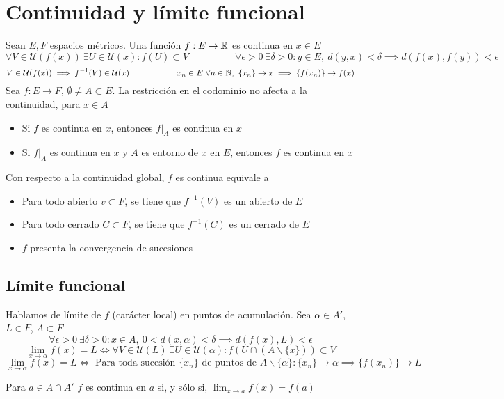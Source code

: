 \section{Continuidad y límite funcional}
Sean $E,F$ espacios métricos.
Una función $f:E\rightarrow\mathbb{R}$ es continua en $x\in E$
$$ \forall V\in\mathcal{U}(f(x)) \ \exists U\in \mathcal{U}(x) : f(U) \subset V\hspace{2cm}
\forall\epsilon>0 \ \exists\delta>0 : y\in E,\ d(y,x)<\delta \implies d(f(x),f(y))<\epsilon$$
$$V\in\mathcal{U}(f(x)) \implies f^{-1}(V)\in\mathcal{U}(x)  \hspace{2cm}
x_n\in E\ \forall n\in\mathbb{N},\ \{x_n\}\rightarrow x\implies \{f(x_n)\}\rightarrow f(x) $$
Sea $f:E\rightarrow F$, $\emptyset\not = A\subset E$. La restricción en el codominio no afecta a la continuidad, para $x\in A$
\begin{itemize}
	\item Si $f$ es continua en $x$, entonces $f|_A$ es continua en $x$
	\item Si $f|_A$ es continua en $x$ y $A$ es entorno de $x$ en $E$, entonces $f$ es continua en $x$
\end{itemize}
Con respecto a la continuidad global, $f$ es continua equivale a
\begin{itemize}
	\item Para todo abierto $v\subset F$, se tiene que $f^{-1}(V)$ es un abierto de $E$
	\item Para todo cerrado $C\subset F$, se tiene que $f^{-1}(C)$ es un cerrado de $E$
	\item $f$ presenta la convergencia de sucesiones
\end{itemize}

\subsection{Límite funcional}
Hablamos de límite de $f$ (carácter local) en puntos de acumulación. Sea $\alpha\in A'$, $L\in F$, $A\subset F$
$$ \forall\epsilon>0\ \exists\delta>0 : x\in A, \ 0<d(x,\alpha)<\delta \implies d(f(x),L)<\epsilon$$
$$ \lim_{x\rightarrow \alpha} f(x)=L \Longleftrightarrow
\forall V\in\mathcal{U}(L) \ \exists U\in\mathcal{U}(\alpha) : f(U\cap (A\backslash\{x\})) \subset V$$
$$ \lim_{x\rightarrow \alpha} f(x)=L \Longleftrightarrow
 \text{ Para toda sucesión } \{x_n\} \text{ de puntos de } A\backslash\{\alpha\} : \{x_n\}\rightarrow\alpha \implies \{f(x_n)\}\rightarrow L$$
 
Para $a\in A\cap A'$ $f$ es continua en $a$ si, y sólo si, $\lim_{x\rightarrow a} f(x) = f(a)$

